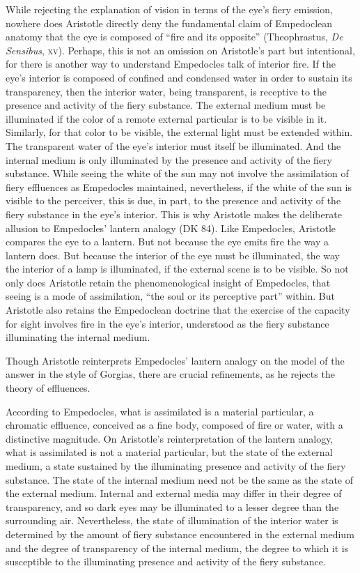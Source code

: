 While rejecting the explanation of vision in terms of the eye's fiery emission, nowhere does Aristotle directly deny the fundamental claim of Empedoclean a\-nat\-o\-my that the eye is composed of ``fire and its opposite'' (Theophrastus, \emph{De Sensibus}, \textsc{xv}). Perhaps, this is not an omission on Aristotle's part but intentional, for there is another way to understand Empedocles talk of interior fire. If the eye's interior is composed of confined and condensed water in order to sustain its transparency, then the interior water, being transparent, is receptive to the presence and activity of the fiery substance. The external medium must be illuminated if the color of a remote external particular is to be visible in it. Similarly, for that color to be visible, the external light must be extended within. The transparent water of the eye's interior must itself be illuminated. And the internal medium is only illuminated by the presence and activity of the fiery substance. While seeing the white of the sun may not involve the assimilation of fiery effluences as Empedocles maintained, nevertheless, if the white of the sun is visible to the perceiver, this is due, in part, to the presence and activity of the fiery substance in the eye's interior. This is why Aristotle makes the deliberate allusion to Empedocles' lantern analogy (DK 84). Like Empedocles, Aristotle compares the eye to a lantern. But not because the eye emits fire the way a lantern does. But because the interior of the eye must be illuminated, the way the interior of a lamp is illuminated, if the external scene is to be visible. So not only does Aristotle retain the phenomenological insight of Empedocles, that seeing is a mode of assimilation, ``the soul or its perceptive part'' within. But Aristotle also retains the Empedoclean doctrine that the exercise of the capacity for sight involves fire in the eye's interior, understood as the fiery substance illuminating the internal medium. 

Though Aristotle reinterprets Empedocles' lantern analogy on the model of the answer in the style of Gorgias, there are crucial refinements, as he rejects the theory of effluences. 

According to Empedocles, what is assimilated is a material particular, a chromatic effluence, conceived as a fine body, composed of fire or water, with a distinctive magnitude. On Aristotle's reinterpretation of the lantern analogy, what is assimilated is not a material particular, but the state of the external medium, a state sustained by the illuminating presence and activity of the fiery substance. The state of the internal medium need not be the same as the state of the external medium. Internal and external media may differ in their degree of transparency, and so dark eyes may be illuminated to a lesser degree than the surrounding air. Nevertheless, the state of illumination of the interior water is determined by the amount of fiery substance encountered in the external medium and the degree of transparency of the internal medium, the degree to which it is susceptible to the illuminating presence and activity of the fiery substance. 

